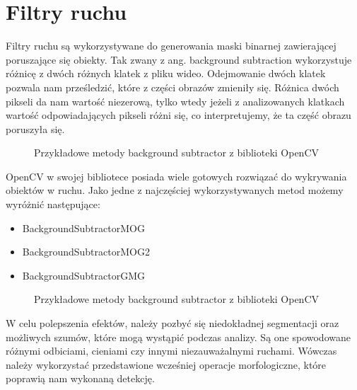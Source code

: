 \documentclass[a4paper,12pt,twoside,openany]{report}
\newcommand{\ImgPath}{.}
\begin{document}
\section{Filtry ruchu}
Filtry ruchu są wykorzystywane do generowania maski binarnej zawierającej poruszające się obiekty. Tak zwany z ang. background subtraction wykorzystuje różnicę z dwóch różnych klatek z pliku wideo. Odejmowanie dwóch klatek pozwala nam prześledzić, które z części obrazów zmieniły się. Różnica dwóch pikseli da nam wartość niezerową, tylko wtedy jeżeli z analizowanych klatkach wartość odpowiadających pikseli różni się, co interpretujemy, że ta część obrazu poruszyła się. 

\begin{figure}[H]
	\centering
	\caption{Przykładowe metody background subtractor z biblioteki OpenCV}
\end{figure}

OpenCV w swojej bibliotece posiada wiele gotowych rozwiązać do wykrywania obiektów w ruchu. Jako jedne z najczęściej wykorzystywanych metod możemy wyróżnić następujące:
\begin{itemize} 
	\item BackgroundSubtractorMOG
	\item BackgroundSubtractorMOG2
	\item BackgroundSubtractorGMG
\end{itemize} 
	
\begin{figure}[H]
	\centering
	\caption{Przykładowe metody background subtractor z biblioteki OpenCV}
\end{figure}

W celu polepszenia efektów, należy pozbyć się niedokładnej segmentacji oraz możliwych szumów,  które mogą wystąpić podczas analizy. Są one spowodowane różnymi odbiciami, cieniami czy innymi niezauważalnymi ruchami. Wówczas należy wykorzystać przedstawione wcześniej operacje morfologiczne, które poprawią nam wykonaną detekcję.
\end{document}
